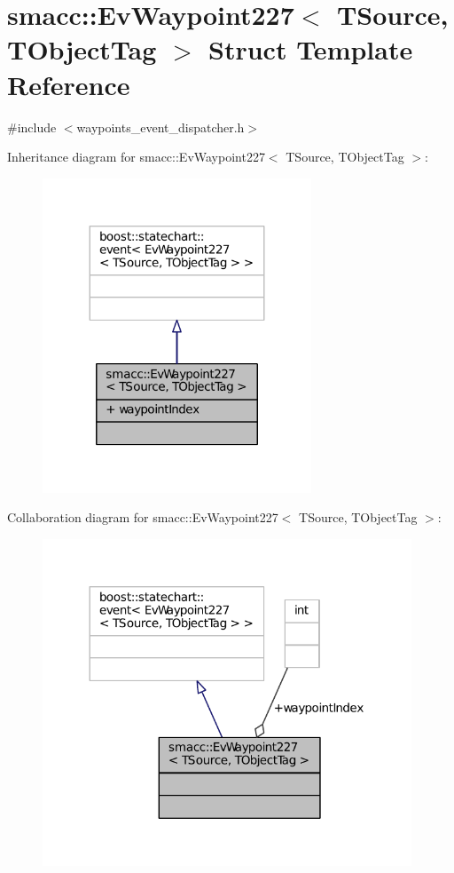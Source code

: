 \hypertarget{structsmacc_1_1EvWaypoint227}{}\section{smacc\+:\+:Ev\+Waypoint227$<$ T\+Source, T\+Object\+Tag $>$ Struct Template Reference}
\label{structsmacc_1_1EvWaypoint227}


{\ttfamily \#include $<$waypoints\+\_\+event\+\_\+dispatcher.\+h$>$}



Inheritance diagram for smacc\+:\+:Ev\+Waypoint227$<$ T\+Source, T\+Object\+Tag $>$\+:
\nopagebreak
\begin{figure}[H]
\begin{center}
\leavevmode
\includegraphics[width=227pt]{structsmacc_1_1EvWaypoint227__inherit__graph}
\end{center}
\end{figure}


Collaboration diagram for smacc\+:\+:Ev\+Waypoint227$<$ T\+Source, T\+Object\+Tag $>$\+:
\nopagebreak
\begin{figure}[H]
\begin{center}
\leavevmode
\includegraphics[width=312pt]{structsmacc_1_1EvWaypoint227__coll__graph}
\end{center}
\end{figure}
